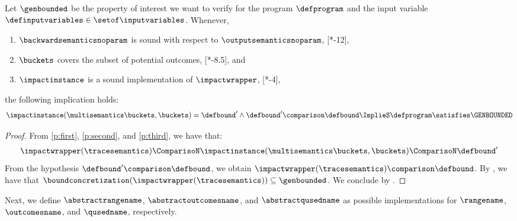 \begin{theorem}[Soundness] 
  Let $\genbounded$ be the property of interest we want to verify for the program $\defprogram$ and the input variable $\definputvariables\in\setof\inputvariables$.
  Whenever,
  \begin{enumerate}[label=(\roman*)]
    \item \label{p:first} $\backwardsemanticsnoparam$ is sound with respect to $\outputsemanticsnoparam$, \cf{} [*-12],
    \item \label{p:second} $\buckets$ covers the subset of potential outcomes, \cf{} [*-8.5], and
    \item \label{p:third} $\impactinstance$ is a sound implementation of $\impactwrapper$, \cf{} [*-4],
\end{enumerate}
  the following implication holds:
  \begin{align*}
    \impactinstance(\multisemantics\buckets, \buckets) = \defbound' \land \defbound' \comparison \defbound \ImplieS \defprogram \satisfies \GENBOUNDED
  \end{align*}
\end{theorem}
\begin{proof}
  From \ref{p:first}, \ref{p:second}, and \ref{p:third}, we have that:
  \begin{align*}
    \impactwrapper(\tracesemantics) \ComparisoN \impactinstance(\multisemantics\buckets, \buckets) \ComparisoN \defbound'
  \end{align*}
  From the hypothesis $\defbound' \comparison \defbound$, we obtain $\impactwrapper(\tracesemantics)\comparison \defbound$.
  By , we have that $\boundconcretization(\impactwrapper(\tracesemantics)) \subseteq \genbounded$.
  We conclude by .
\end{proof}


Next,
we define $\abstractrangename$, $\abstractoutcomesname$, and $\abstractqusedname$
as possible implementations for $\rangename$, $\outcomesname$, and $\qusedname$, respectively.

